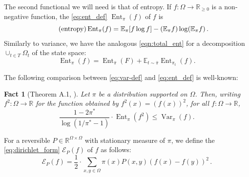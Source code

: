 \documentclass[a4paper, 12p]{article}
\numberwithin{equation}{section}
\newcommand{\Exp}{\mathbb{E}}
\newcommand{\piproj}{\overline{\pi}}
\newcommand{\var}{\operatorname{Var}}
\newcommand{\dir}{\mathcal{E}}
\newcommand{\ent}{\operatorname{Ent}}
\newcommand{\Om}{\Omega}
\newtheorem{fact}[theorem]{Fact}
\DeclarePairedDelimiter\parens{\lparen}{\rparen}
\DeclarePairedDelimiter\sqbr{[ }{]}
\begin{document}
The second functional we will need is that of entropy. If $f: \Omega \to \mathbb R_{\ge 0}$ is a non-negative function, the \ref{eq:ent_def} $\ent_\pi(f)$ of $f$ is
\begin{equation}\label{eq:ent_def}\tag{entropy}
    \ent_\pi(f) = \Exp_{\pi}\sqbr*{ f \log f} - \parens*{ \Exp_\pi f} \log \parens*{\Exp_\pi f}\,.
\end{equation}
Similarly to variance, we have the analogous \ref{eqn:total_ent} for a decomposition $\cup_{t\in T}\Om_t$ of the state space:
\begin{equation}\label{eqn:total_ent}
    \ent_{\pi}( f )= \ent_{\piproj} (F) + \Exp_{t \sim \piproj} \ent_{\pi_t}(f).
    \tag{law of total entropy}
\end{equation}

The following comparison between \ref{eq:var-def} and \ref{eq:ent_def} is well-known:
\begin{fact}[Theorem A.1, \cite{diaconis1996logarithmic}]\label{fac:varent_comp}
    Let $\pi$ be a distribution supported on $\Omega$. Then, writing $f^2: \Omega \to \mathbb R$ for the function obtained by $f^2(x) = (f(x))^2$, for all $f: \Omega \to \mathbb R$,
    \[ \frac{1 - 2\pi^*}{\log(1/\pi^* - 1)} \cdot \ent_\pi(f^2) \le \var_\pi(f).\]
\end{fact}


For a reversible $P \in \mathbb R^{\Omega \times \Omega}$ with
stationary measure of $\pi$, we define the \ref{eq:dirichlet_form} $\dir_P(f)$ of $f$ as follows:
\begin{equation}\label{eq:dirichlet_form}\tag{Dirichlet form} \dir_P(f) = \frac12 \cdot\sum_{x, y \in \Omega} \pi(x) P(x, y)( f(x) - f(y))^2\,.
\end{equation}
\end{document}
